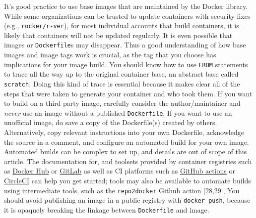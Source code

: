 \documentclass[10pt,letterpaper]{article}
\begin{document}
  \label{rule:base} 

It's good practice to use base images that are maintained by the Docker
library. While some organizations can be trusted to update containers
with security fixes (e.g., \texttt{rocker/r-ver}), for most individual
accounts that build containers, it is likely that containers will not be
updated regularly. It is even possible that images or
\texttt{Dockerfile}s may disappear. Thus a good understanding of how
base images and image tags work is crucial, as the tag that you choose
has implications for your image build. You should know how to use
\texttt{FROM} statements to trace all the way up to the original
container base, an abstract base called \texttt{scratch}. Doing this
kind of trace is essential because it makes clear all of the steps that
were taken to generate your container and who took them. If you want to
build on a third party image, carefully consider the author/maintainer
and \emph{never} use an image without a published \texttt{Dockerfile}.
If you want to use an unofficial image, do save a copy of the
Dockerfile(s) created by others. Alternatively, copy relevant
instructions into your own Dockerfile, acknowledge the source in a
comment, and configure an automated build for your own image. Automated
builds can be complex to set up, and details are out of scope of this
article. The documentation for, and toolsets provided by container
registries such as
\href{https://docs.docker.com/docker-hub/builds/}{Docker Hub} or
\href{https://docs.gitlab.com/ee/user/packages/container_registry/index.html\#build-and-push-images}{GitLab}
as well as CI platforms such as
\href{https://github.com/actions/starter-workflows/tree/master/ci}{GitHub
actions} or
\href{https://circleci.com/orbs/registry/orb/circleci/docker\#commands-build}{CircleCI}
can help you get started; tools may also be available to automate builds
using intermediate tools, such as the \texttt{repo2docker} Github action
{[}28,29{]}, You should avoid publishing an image in a public registry
with \texttt{docker\ push}, because it is opaquely breaking the linkage
between \texttt{Dockerfile} and image.
\end{document}
